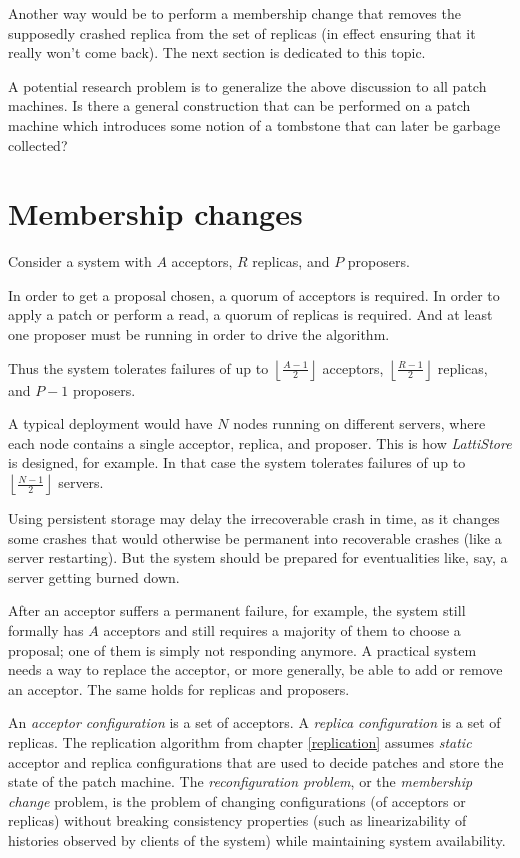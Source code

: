 \documentclass[12pt,a4paper,en]{pracamgr}
\newcommand{\ti}[1]{\textit{#1}}
\newcommand{\floor}[1]{\left \lfloor #1 \right \rfloor}
\begin{document}
Another way would be to perform a membership change that removes the supposedly crashed replica from the set of replicas (in effect ensuring that it really won't come back). The next section is dedicated to this topic.

A potential research problem is to generalize the above discussion to all patch machines. Is there a general construction that can be performed on a patch machine which introduces some notion of a tombstone that can later be garbage collected?

\section{Membership changes}\label{membership}

Consider a system with $A$ acceptors, $R$ replicas, and $P$ proposers.

In order to get a proposal chosen, a quorum of acceptors is required. In order to apply a patch or perform a read, a quorum of replicas is required. And at least one proposer must be running in order to drive the algorithm.

Thus the system tolerates failures of up to $\floor{\frac{A - 1}{2}}$ acceptors, $\floor{\frac{R-1}{2}}$ replicas, and $P-1$ proposers.

A typical deployment would have $N$ nodes running on different servers, where each node contains a single acceptor, replica, and proposer. This is how \ti{LattiStore} is designed, for example. In that case the system tolerates failures of up to $\floor{\frac{N-1}{2}}$ servers.

Using persistent storage may delay the irrecoverable crash in time, as it changes some crashes that would otherwise be permanent into recoverable crashes (like a server restarting). But the system should be prepared for eventualities like, say, a server getting burned down.

After an acceptor suffers a permanent failure, for example, the system still formally has $A$ acceptors and still requires a majority of them to choose a proposal; one of them is simply not responding anymore. A practical system needs a way to replace the acceptor, or more generally, be able to add or remove an acceptor. The same holds for replicas and proposers.

An \ti{acceptor configuration} is a set of acceptors. A \ti{replica configuration} is a set of replicas. The replication algorithm from chapter \ref{replication} assumes \ti{static} acceptor and replica configurations that are used to decide patches and store the state of the patch machine. The \ti{reconfiguration problem}, or the \ti{membership change} problem, is the problem of changing configurations (of acceptors or replicas) without breaking consistency properties (such as linearizability of histories observed by clients of the system) while maintaining system availability.
\end{document}

